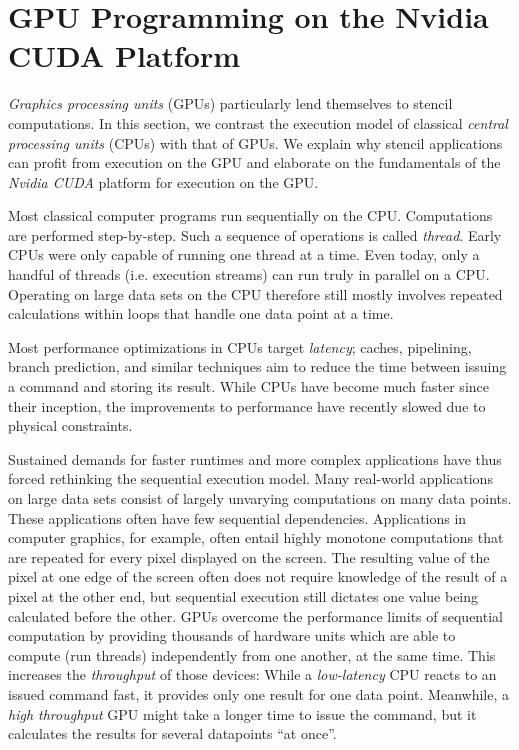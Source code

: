 \section{GPU Programming on the Nvidia CUDA Platform} 	\label{sec:cuda-basics}

\emph{Graphics processing units} (GPUs) particularly lend themselves to stencil computations. In this section, we contrast the execution model of classical \emph{central processing units} (CPUs) with that of GPUs. We explain why stencil applications can profit from execution on the GPU and elaborate on the fundamentals of the \emph{Nvidia CUDA} platform for execution on the GPU.

Most classical computer programs run sequentially on the CPU. Computations are performed step-by-step. Such a sequence of operations is called \emph{thread}. Early CPUs were only capable of running one thread at a time. Even today, only a handful of threads (i.e. execution streams) can run truly in parallel on a CPU. Operating on large data sets on the CPU therefore still mostly involves repeated calculations within loops that handle one data point at a time.

Most performance optimizations in CPUs target \emph{latency}; caches, pipelining, branch prediction, and similar techniques aim to reduce the time between issuing a command and storing its result. While CPUs have become much faster since their inception, the improvements to performance have recently slowed due to physical constraints.

Sustained demands for faster runtimes and more complex applications have thus forced rethinking the sequential execution model. Many real-world applications on large data sets consist of largely unvarying computations on many data points. These applications often have few sequential dependencies. Applications in computer graphics, for example, often entail highly monotone computations that are repeated for every pixel displayed on the screen. The resulting value of the pixel at one edge of the screen often does not require knowledge of the result of a pixel at the other end, but sequential execution still dictates one value being calculated before the other. GPUs overcome the performance limits of sequential computation by providing thousands of hardware units which are able to compute (run threads) independently from one another, at the same time. \cite[Chapter~2]{cuda-for-engineers} This increases the \emph{throughput} of those devices: While a \emph{low-latency} CPU reacts to an issued command fast, it provides only one result for one data point. Meanwhile, a \emph{high throughput} GPU might take a longer time to issue the command, but it calculates the results for several datapoints ``at once''.

